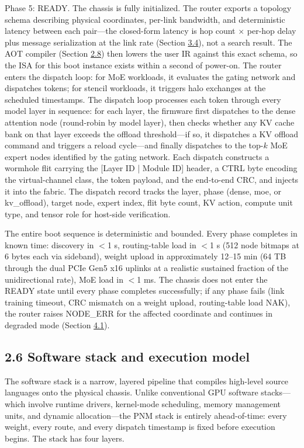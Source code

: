 \documentclass[12pt,onecolumn]{article}
\begin{document}
Phase 5: READY. The chassis is fully initialized. The router exports a topology schema describing physical coordinates, per-link bandwidth, and deterministic latency between each pair---the closed-form latency is hop count $\times$ per-hop delay plus message serialization at the link rate (Section \hyperref[sec:3.4]{3.4}), not a search result. The AOT compiler (Section \hyperref[sec:2.8]{2.8}) then lowers the user IR against this exact schema, so the ISA for this boot instance exists within a second of power-on. The router enters the dispatch loop: for MoE workloads, it evaluates the gating network and dispatches tokens; for stencil workloads, it triggers halo exchanges at the scheduled timestamps. The dispatch loop processes each token through every model layer in sequence: for each layer, the firmware first dispatches to the dense attention node (round-robin by model layer), then checks whether any KV cache bank on that layer exceeds the offload threshold---if so, it dispatches a KV offload command and triggers a reload cycle---and finally dispatches to the top-$k$ MoE expert nodes identified by the gating network. Each dispatch constructs a wormhole flit carrying the [Layer ID | Module ID] header, a CTRL byte encoding the virtual-channel class, the token payload, and the end-to-end CRC, and injects it into the fabric. The dispatch record tracks the layer, phase (dense, moe, or kv\_offload), target node, expert index, flit byte count, KV action, compute unit type, and tensor role for host-side verification.

The entire boot sequence is deterministic and bounded. Every phase completes in known time: discovery in $<$1 s, routing-table load in $<$1 s (512 node bitmaps at 6 bytes each via sideband), weight upload in approximately 12--15 min (64 TB through the dual PCIe Gen5 x16 uplinks at a realistic sustained fraction of the unidirectional rate), MoE load in $<$1 ms. The chassis does not enter the READY state until every phase completes successfully; if any phase fails (link training timeout, CRC mismatch on a weight upload, routing-table load NAK), the router raises NODE\_ERR for the affected coordinate and continues in degraded mode (Section \hyperref[sec:4.1]{4.1}).

\subsection*{2.6 Software stack and execution model}\label{sec:2.6}

The software stack is a narrow, layered pipeline that compiles high-level source languages onto the physical chassis. Unlike conventional GPU software stacks---which involve runtime drivers, kernel-mode scheduling, memory management units, and dynamic allocation---the PNM stack is entirely ahead-of-time: every weight, every route, and every dispatch timestamp is fixed before execution begins. The stack has four layers.
\end{document}

